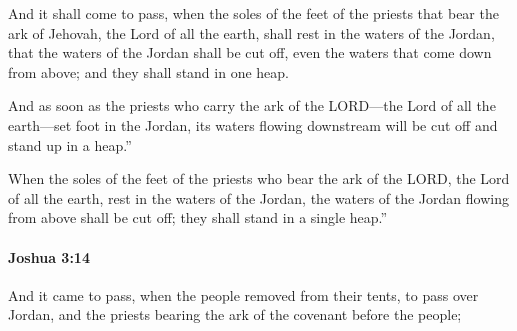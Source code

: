 			\begin{versebox}
					\item[BHS] 
					\item[ASV] And it shall come to pass, when the soles of the feet of the priests that bear the ark of Jehovah, the Lord of all the earth, shall rest in the waters of the Jordan, that the waters of the Jordan shall be cut off, even the waters that come down from above; and they shall stand in one heap.
					\item[NIV] And as soon as the priests who carry the ark of the LORD—the Lord of all the earth—set foot in the Jordan, its waters flowing downstream will be cut off and stand up in a heap.”
					\item[NRSV] When the soles of the feet of the priests who bear the ark of the LORD, the Lord of all the earth, rest in the waters of the Jordan, the waters of the Jordan flowing from above shall be cut off; they shall stand in a single heap.”
			\end{versebox}

		\paragraph{Joshua 3:14} %
			\label{JOSHUA-3-14}

			And it came to pass, when the people removed from their tents, to pass over Jordan, and the priests bearing the ark of the covenant before the people;

